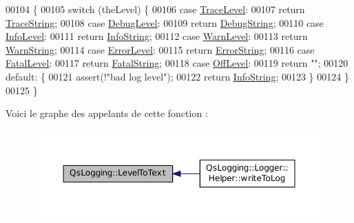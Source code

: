\begin{DoxyCode}
00104 \{
00105     \textcolor{keywordflow}{switch} (theLevel) \{
00106     \textcolor{keywordflow}{case} \hyperlink{namespaceQsLogging_a38c7dd87e4de6f8eb460763ad0baa033a187ba10e2b3b400c6ee33afe6fc10915}{TraceLevel}:
00107         \textcolor{keywordflow}{return} \hyperlink{namespaceQsLogging_a8bb6a67c53ebaad64d3e58c5a5a362ee}{TraceString};
00108     \textcolor{keywordflow}{case} \hyperlink{namespaceQsLogging_a38c7dd87e4de6f8eb460763ad0baa033a2a6c1ca8703fa87e56dae43e9adbecda}{DebugLevel}:
00109         \textcolor{keywordflow}{return} \hyperlink{namespaceQsLogging_a961ecb32f941957f4fb2ce0e244e1dc0}{DebugString};
00110     \textcolor{keywordflow}{case} \hyperlink{namespaceQsLogging_a38c7dd87e4de6f8eb460763ad0baa033a6447c84a2844e8e1d0cdb95b55ecac72}{InfoLevel}:
00111         \textcolor{keywordflow}{return} \hyperlink{namespaceQsLogging_a747ad47c7ca8e96d020e912573d18cd1}{InfoString};
00112     \textcolor{keywordflow}{case} \hyperlink{namespaceQsLogging_a38c7dd87e4de6f8eb460763ad0baa033ac744dbb976c301fa466a390b808e2eef}{WarnLevel}:
00113         \textcolor{keywordflow}{return} \hyperlink{namespaceQsLogging_a448066a966f37903f05c519ceb33814f}{WarnString};
00114     \textcolor{keywordflow}{case} \hyperlink{namespaceQsLogging_a38c7dd87e4de6f8eb460763ad0baa033a3d6b56d79245ec74186a538f2e6b3cf2}{ErrorLevel}:
00115         \textcolor{keywordflow}{return} \hyperlink{namespaceQsLogging_a81932d0d90f858336dcae9ea81560f51}{ErrorString};
00116     \textcolor{keywordflow}{case} \hyperlink{namespaceQsLogging_a38c7dd87e4de6f8eb460763ad0baa033ab961256fd76d6571a41516e1794f39de}{FatalLevel}:
00117         \textcolor{keywordflow}{return} \hyperlink{namespaceQsLogging_a6664814676313b529499e9590ed1c476}{FatalString};
00118     \textcolor{keywordflow}{case} \hyperlink{namespaceQsLogging_a38c7dd87e4de6f8eb460763ad0baa033a64b8289ed8a99f811404140cbcb2549c}{OffLevel}:
00119         \textcolor{keywordflow}{return} \textcolor{stringliteral}{""};
00120     \textcolor{keywordflow}{default}: \{
00121         assert(!\textcolor{stringliteral}{"bad log level"});
00122         \textcolor{keywordflow}{return} \hyperlink{namespaceQsLogging_a747ad47c7ca8e96d020e912573d18cd1}{InfoString};
00123     \}
00124     \}
00125 \}
\end{DoxyCode}


Voici le graphe des appelants de cette fonction \-:
\nopagebreak
\begin{figure}[H]
\begin{center}
\leavevmode
\includegraphics[width=350pt]{namespaceQsLogging_a8e669585768b47ba483f7325c18d60b8_icgraph}
\end{center}
\end{figure}




